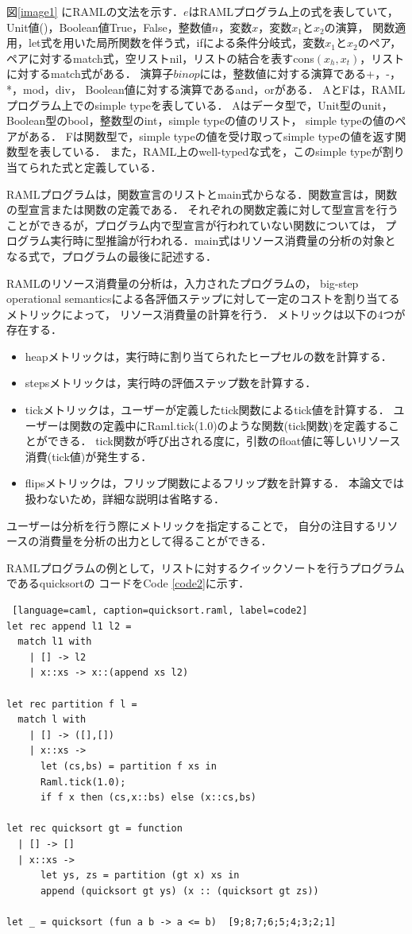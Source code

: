 \documentclass{kuisthesis}
\begin{document}
図\ref{image1} にRAMLの文法を示す．$e$はRAMLプログラム上の式を表していて，
Unit値()，Boolean値True，False，整数値$n$，変数$x$，変数$x_1$と$x_2$の演算，
関数適用，let式を用いた局所関数を伴う式，ifによる条件分岐式，変数$x_1$と$x_2$のペア，
ペアに対するmatch式，空リストnil，リストの結合を表すcons$(x_h,x_t)$，リストに対するmatch式がある．
演算子$binop$には，整数値に対する演算である+，-，*，mod，div，
Boolean値に対する演算であるand，orがある．
AとFは，RAMLプログラム上でのsimple typeを表している．
Aはデータ型で，Unit型のunit，Boolean型のbool，整数型のint，simple typeの値のリスト，
simple typeの値のペアがある．
Fは関数型で，simple typeの値を受け取ってsimple typeの値を返す関数型を表している．
また，RAML上のwell-typedな式を，このsimple typeが割り当てられた式と定義している．

RAMLプログラムは，関数宣言のリストとmain式からなる．関数宣言は，関数の型宣言または関数の定義である．
それぞれの関数定義に対して型宣言を行うことができるが，プログラム内で型宣言が行われていない関数については，
プログラム実行時に型推論が行われる．main式はリソース消費量の分析の対象となる式で，プログラムの最後に記述する．


RAMLのリソース消費量の分析は，入力されたプログラムの，
big-step operational semanticsによる各評価ステップに対して一定のコストを割り当てるメトリックによって，
リソース消費量の計算を行う．
メトリックは以下の4つが存在する．
\begin{itemize}
  \item heapメトリックは，実行時に割り当てられたヒープセルの数を計算する．
  \item stepsメトリックは，実行時の評価ステップ数を計算する．
  \item tickメトリックは，ユーザーが定義したtick関数によるtick値を計算する．
  ユーザーは関数の定義中にRaml.tick(1.0)のような関数(tick関数)を定義することができる．
  tick関数が呼び出される度に，引数のfloat値に等しいリソース消費(tick値)が発生する．
  \item flipsメトリックは，フリップ関数によるフリップ数を計算する．
  本論文では扱わないため，詳細な説明は省略する．
\end{itemize}

ユーザーは分析を行う際にメトリックを指定することで，
自分の注目するリソースの消費量を分析の出力として得ることができる．

RAMLプログラムの例として，リストに対するクイックソートを行うプログラムであるquicksortの
コードをCode \ref{code2}に示す．
\\

\begin{lstlisting} [language=caml, caption=quicksort.raml, label=code2]
let rec append l1 l2 =
  match l1 with
    | [] -> l2
    | x::xs -> x::(append xs l2)

let rec partition f l =
  match l with
    | [] -> ([],[])
    | x::xs ->
      let (cs,bs) = partition f xs in
      Raml.tick(1.0);
      if f x then (cs,x::bs) else (x::cs,bs)

let rec quicksort gt = function
  | [] -> []
  | x::xs ->
      let ys, zs = partition (gt x) xs in
      append (quicksort gt ys) (x :: (quicksort gt zs))

let _ = quicksort (fun a b -> a <= b)  [9;8;7;6;5;4;3;2;1]
\end{lstlisting}
\end{document}
